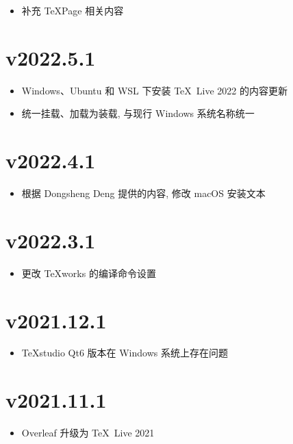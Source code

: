 \begin{itemize}
  \item 补充 TeXPage 相关内容
\end{itemize}

\section*{v2022.5.1}

\begin{itemize}
  \item Windows、Ubuntu 和 WSL 下安装 \TeX~Live 2022 的内容更新
  \item 统一挂载、加载为装载, 与现行 Windows 系统名称统一
\end{itemize}

\section*{v2022.4.1}

\begin{itemize}
  \item 根据 Dongsheng Deng 提供的内容, 修改 macOS 安装文本
\end{itemize}

\section*{v2022.3.1}

\begin{itemize}
  \item 更改 \TeX works 的编译命令设置
\end{itemize}

\section*{v2021.12.1}

\begin{itemize}
  \item \TeX studio Qt6 版本在 Windows 系统上存在问题
\end{itemize}

\section*{v2021.11.1}

\begin{itemize}
  \item Overleaf 升级为 \TeX~Live 2021
\end{itemize}

